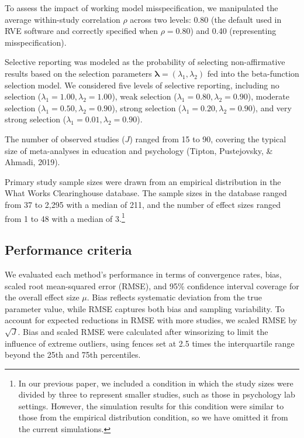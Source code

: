 \documentclass[
  american,
  man, donotrepeattitle,floatsintext]{apa7}
\begin{document}
To assess the impact of working model misspecification, we manipulated the average within-study correlation \(\rho\) across two levels: 0.80 (the default used in RVE software and correctly specified when \(\rho = 0.80\)) and 0.40 (representing misspecification).

Selective reporting was modeled as the probability of selecting non-affirmative results based on the selection parameters \(\boldsymbol\lambda = (\lambda_1, \lambda_2)\) fed into the beta-function selection model. We considered five levels of selective reporting, including no selection (\(\lambda_1 = 1.00, \lambda_2 = 1.00\)), weak selection (\(\lambda_1 = 0.80, \lambda_2 = 0.90\)), moderate selection (\(\lambda_1 = 0.50, \lambda_2 = 0.90\)), strong selection (\(\lambda_1 = 0.20, \lambda_2 = 0.90\)), and very strong selection (\(\lambda_1 = 0.01, \lambda_2 = 0.90\)).

The number of observed studies (\(J\)) ranged from 15 to 90, covering the typical size of meta-analyses in education and psychology (Tipton, Pustejovsky, \& Ahmadi, 2019).

Primary study sample sizes were drawn from an empirical distribution in the What Works Clearinghouse database. The sample sizes in the database ranged from 37 to 2,295 with a median of 211, and the number of effect sizes ranged from 1 to 48 with a median of 3.\footnote{
  In our previous paper, we included a condition in which the study sizes were divided by three to represent smaller studies, such as those in psychology lab settings. However, the simulation results for this condition were similar to those from the empirical distribution condition, so we have omitted it from the current simulations.}

\subsection{Performance criteria}\label{performance-criteria}

We evaluated each method's performance in terms of convergence rates, bias, scaled root mean-squared error (RMSE), and 95\% confidence interval coverage for the overall effect size \(\mu\). Bias reflects systematic deviation from the true parameter value, while RMSE captures both bias and sampling variability. To account for expected reductions in RMSE with more studies, we scaled RMSE by \(\sqrt{J}\). Bias and scaled RMSE were calculated after winsorizing to limit the influence of extreme outliers, using fences set at 2.5 times the interquartile range beyond the 25th and 75th percentiles.
\end{document}
